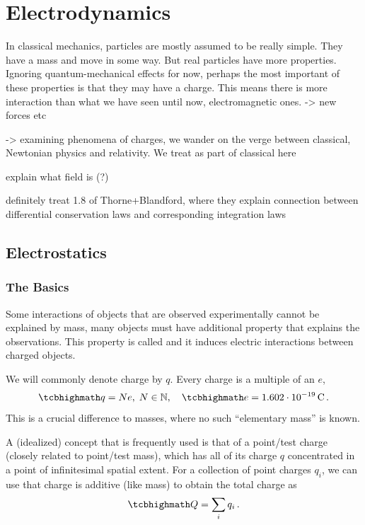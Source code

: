 \documentclass[../class_mech_main.tex]{subfiles}
\begin{document}
\chapter{Electrodynamics}




In classical mechanics, particles are mostly assumed to be really simple. They have a mass and move in some way. But real particles have more properties. Ignoring quantum-mechanical effects for now, perhaps the most important of these properties is that they may have a charge. This means there is more interaction than what we have seen until now, electromagnetic ones. -> new forces etc


-> examining phenomena of charges, we wander on the verge between classical, Newtonian physics and relativity. We treat as part of classical here


explain what field is (?)


definitely treat 1.8 of Thorne+Blandford, where they explain connection between differential conservation laws and corresponding integration laws



    \section{Electrostatics}

        \subsection{The Basics}
Some interactions of objects that are observed experimentally cannot be explained by mass, many objects must have additional property that explains the observations. This property is called  and it induces electric interactions between charged objects.


We will commonly denote charge by $q$. Every charge is a multiple of an  $e$,
\begin{equation}
    \eqbox{
        q = N e
    }, \; N \in \mathbb{N}
    , \quad
    \eqbox{
        e = 1.602 \cdot 10^{-19} \, \unit{\coulomb}
    } \, .
\end{equation}
This is a crucial difference to masses, where no such \enquote{elementary mass} is known.

A (idealized) concept that is frequently used is that of a point/test charge (closely related to point/test mass), which has all of its charge $q$ concentrated in a point of infinitesimal spatial extent. For a collection of point charges $q_i$, we can use that charge is additive (like mass) to obtain the total charge as
\begin{equation}
    \eqbox{
        Q = \sum_i q_i
    } \, .
\end{equation}
\end{document}
